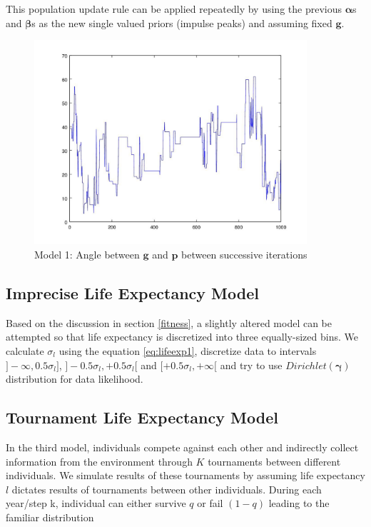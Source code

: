 \documentclass{article}
\begin{document}
This population update rule can be applied repeatedly by using the previous $\bm{\alpha}$s and $\bm{\beta}$s as the new single valued priors (impulse peaks) and assuming fixed $\bm{g}$.

\begin{figure}

\centering
\includegraphics[keepaspectratio,width=0.9\textwidth]{method1.jpg}

\caption{Model 1: Angle between $\bm{g}$ and $\bm{p}$ between successive iterations}

\label{fig:method1}

\end{figure}


\subsection{Imprecise Life Expectancy Model}
\label{dlifesec2}

Based on the discussion in section \ref{fitness}, a slightly altered model can be attempted so that life expectancy is discretized into three equally-sized bins. We calculate $\sigma_l$ using the equation \ref{eq:lifeexp1},  discretize data to intervals $]-\infty,0.5\sigma_l]$, $]-0.5\sigma_l,+0.5\sigma_l[$ and $[+0.5\sigma_l,+\infty[$ and try to use $Dirichlet(\bm{\gamma})$ distribution for data likelihood.

\subsection{Tournament Life Expectancy Model}

In the third model, individuals compete against each other and indirectly collect information from the environment through $K$ tournaments between different individuals. We simulate results of these tournaments by assuming life expectancy $l$ dictates results of tournaments between other individuals. During each year/step k, individual can either survive $q$ or fail $(1-q)$ leading to the familiar distribution 
\end{document}
